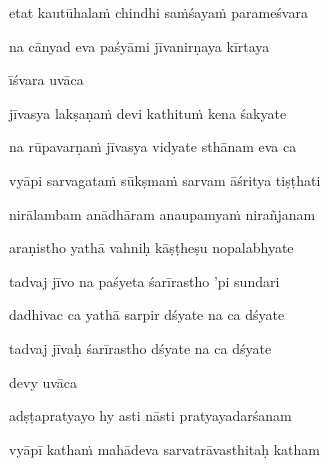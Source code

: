 etat kautūhala\.m chindhi sa\.mśaya\.m parameśvara\thinspace{\dandab} \dontdisplaylinenum

na cānyad eva paśyāmi jīvanirṇaya kīrtaya \veg\dontdisplaylinenum

īśvara uvāca~{\dandab}\dontdisplaylinenum 

jīvasya lakṣaṇa\.m devi kathitu\.m kena śakyate\thinspace{\danda} \dontdisplaylinenum

na rūpavarṇa\.m jīvasya vidyate sthānam eva ca \veg\dontdisplaylinenum

vyāpi sarvagata\.m sūkṣma\.m sarvam āśritya tiṣṭhati\thinspace{\dandab} \dontdisplaylinenum

nirālambam anādhāram anaupamya\.m nirañjanam \veg\dontdisplaylinenum

araṇistho yathā vahniḥ kāṣṭheṣu nopalabhyate\thinspace{\dandab} \dontdisplaylinenum

tadvaj jīvo na paśyeta śarīrastho 'pi sundari \veg\dontdisplaylinenum

dadhivac ca yathā sarpir dśyate na ca dśyate\thinspace{\dandab} \dontdisplaylinenum

tadvaj jīvaḥ śarīrastho dśyate na ca dśyate \veg\dontdisplaylinenum

devy uvāca~{\dandab}\dontdisplaylinenum 

adṣṭapratyayo hy asti nāsti pratyayadarśanam\thinspace{\danda} \dontdisplaylinenum

vyāpī katha\.m mahādeva sarvatrāvasthitaḥ katham \veg\dontdisplaylinenum

